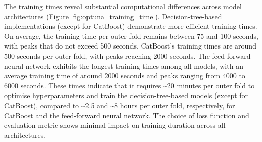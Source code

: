 \begin{figure}[htbp]
\label{fig:optuna_history}
\end{figure}

The  training times reveal substantial computational differences across model architectures (Figure \ref{fig:optuna_training_time}). Decision-tree-based implementations (except for CatBoost) demonstrate more efficient training times. On average, the training time per outer fold remains between 75 and 100 seconds, with peaks that do not exceed 500 seconds. CatBoost's training times are around 500 seconds per outer fold, with peaks reaching 2000 seconds. The feed-forward neural network exhibits the longest training times among all models, with an average training time of around 2000 seconds and peaks ranging from 4000 to 6000 seconds. These times indicate that it requires \sim20 minutes per outer fold to optimise hyperparameters and train the decision-tree-based models (except for CatBoost), compared to \sim2.5 and \sim8 hours per outer fold, respectively, for CatBoost and the feed-forward neural network. The choice of loss function and evaluation metric shows minimal impact on training duration across all architectures.

